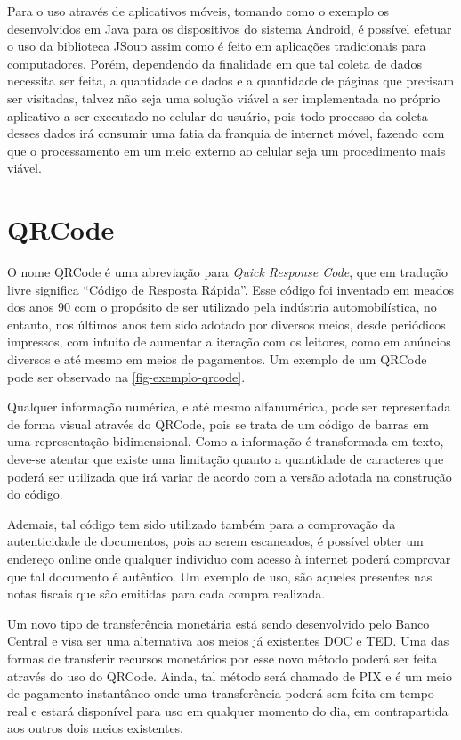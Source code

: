 Para o uso através de aplicativos móveis, tomando como o exemplo os desenvolvidos em Java para os dispositivos do sistema Android, é possível efetuar o uso da biblioteca JSoup assim como é feito em aplicações tradicionais para computadores\cite{jSoupAndroid}. Porém, dependendo da finalidade em que tal coleta de dados necessita ser feita, a quantidade de dados e a quantidade de páginas que precisam ser visitadas, talvez não seja uma solução viável a ser implementada no próprio aplicativo a ser executado no celular do usuário, pois todo processo da coleta desses dados irá consumir uma fatia da franquia de internet móvel, fazendo com que o processamento em um meio externo ao celular seja um procedimento mais viável.

\section{QRCode}

O nome QRCode\cite{qrCodeOlharDigital} é uma abreviação para \textit{Quick Response Code}, que em tradução livre significa ``Código de Resposta Rápida''. Esse código foi inventado em meados dos anos 90 com o propósito de ser utilizado pela indústria automobilística, no entanto, nos últimos anos tem sido adotado por diversos meios, desde periódicos impressos, com intuito de aumentar a iteração com os leitores, como em anúncios diversos e até mesmo em meios de pagamentos\cite{qrCodeCanalTech}. Um exemplo de um QRCode pode ser observado na \autoref{fig-exemplo-qrcode}.

Qualquer informação numérica, e até mesmo alfanumérica, pode ser representada de forma visual através do QRCode, pois se trata de um código de barras em uma representação bidimensional. Como a informação é transformada em texto, deve-se atentar que existe uma limitação quanto a quantidade de caracteres que poderá ser utilizada que irá variar de acordo com a versão adotada na construção do código.

Ademais, tal código tem sido utilizado também para a comprovação da autenticidade de documentos, pois ao serem escaneados, é possível obter um endereço online onde qualquer indivíduo com acesso à internet poderá comprovar que tal documento é autêntico. Um exemplo de uso, são aqueles presentes nas notas fiscais que são emitidas para cada compra realizada.\cite{nfceDefinicao}

Um novo tipo de transferência monetária está sendo desenvolvido pelo Banco Central e visa ser uma alternativa aos meios já existentes DOC e TED. Uma das formas de transferir recursos monetários por esse novo método poderá ser feita através do uso do QRCode. Ainda, tal método será chamado de PIX e é um meio de pagamento instantâneo onde uma transferência poderá sem feita em tempo real e estará disponível para uso em qualquer momento do dia, em contrapartida aos outros dois meios existentes.\cite{pixDefinicao}

